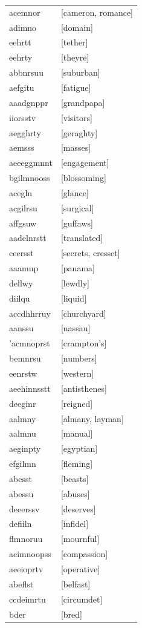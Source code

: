 \documentclass{article}
\begin{document}
\begin{tabular}{ll}
acemnor & [cameron, romance] \\
adimno & [domain] \\
eehrtt & [tether] \\
eehrty & [theyre] \\
abbnrsuu & [suburban] \\
aefgitu & [fatigue] \\
aaadgnppr & [grandpapa] \\
iiorsstv & [visitors] \\
aegghrty & [geraghty] \\
aemsss & [masses] \\
aeeeggmnnt & [engagement] \\
bgilmnooss & [blossoming] \\
acegln & [glance] \\
acgilrsu & [surgical] \\
affgsuw & [guffaws] \\
aadelnrstt & [translated] \\
ceersst & [secrets, cresset] \\
aaamnp & [panama] \\
dellwy & [lewdly] \\
diilqu & [liquid] \\
accdhhrruy & [churchyard] \\
aanssu & [nassau] \\
'acmnoprst & [crampton's] \\
bemnrsu & [numbers] \\
eenrstw & [western] \\
aeehinnsstt & [antisthenes] \\
deeginr & [reigned] \\
aalmny & [almany, layman] \\
aalmnu & [manual] \\
aeginpty & [egyptian] \\
efgilmn & [fleming] \\
abesst & [beasts] \\
abessu & [abuses] \\
deeerssv & [deserves] \\
defiiln & [infidel] \\
flmnoruu & [mournful] \\
acimnoopss & [compassion] \\
aeeioprtv & [operative] \\
abeflst & [belfast] \\
ccdeimrtu & [circumdet] \\
bder & [bred] \\

\end{tabular}
\end{document}
